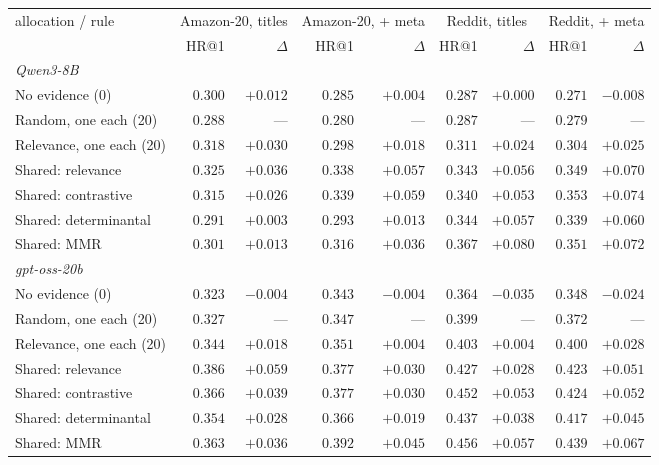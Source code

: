 \begin{tabular}{lrrrrrrrr}
\toprule
allocation / rule & \multicolumn{2}{c}{Amazon-20, titles} & \multicolumn{2}{c}{Amazon-20, + meta} & \multicolumn{2}{c}{Reddit, titles} & \multicolumn{2}{c}{Reddit, + meta} \\
 & HR@1 & $\Delta$ & HR@1 & $\Delta$ & HR@1 & $\Delta$ & HR@1 & $\Delta$ \\
\midrule\multicolumn{9}{l}{\emph{Qwen3-8B}} \\
No evidence (0) & $0.300$ & $+0.012$ & $0.285$ & $+0.004$ & $0.287$ & $+0.000$ & $0.271$ & $-0.008$ \\
Random, one each (20) & $0.288$ & --- & $0.280$ & --- & $0.287$ & --- & $0.279$ & --- \\
Relevance, one each (20) & $0.318$ & $\mathit{+0.030}$ & $0.298$ & $+0.018$ & $0.311$ & $+0.024$ & $0.304$ & $\mathit{+0.025}$ \\
Shared: relevance & $0.325$ & $\mathit{+0.036}$ & $0.338$ & $\mathbf{+0.057}$ & $0.343$ & $\mathbf{+0.056}$ & $0.349$ & $\mathbf{+0.070}$ \\
Shared: contrastive & $0.315$ & $+0.026$ & $0.339$ & $\mathbf{+0.059}$ & $0.340$ & $\mathbf{+0.053}$ & $0.353$ & $\mathbf{+0.074}$ \\
Shared: determinantal & $0.291$ & $+0.003$ & $0.293$ & $+0.013$ & $0.344$ & $\mathbf{+0.057}$ & $0.339$ & $\mathbf{+0.060}$ \\
Shared: MMR & $0.301$ & $+0.013$ & $0.316$ & $\mathbf{+0.036}$ & $0.367$ & $\mathbf{+0.080}$ & $0.351$ & $\mathbf{+0.072}$ \\
\midrule\multicolumn{9}{l}{\emph{gpt-oss-20b}} \\
No evidence (0) & $0.323$ & $-0.004$ & $0.343$ & $-0.004$ & $0.364$ & $\mathbf{-0.035}$ & $0.348$ & $\mathbf{-0.024}$ \\
Random, one each (20) & $0.327$ & --- & $0.347$ & --- & $0.399$ & --- & $0.372$ & --- \\
Relevance, one each (20) & $0.344$ & $+0.018$ & $0.351$ & $+0.004$ & $0.403$ & $+0.004$ & $0.400$ & $\mathbf{+0.028}$ \\
Shared: relevance & $0.386$ & $\mathbf{+0.059}$ & $0.377$ & $\mathit{+0.030}$ & $0.427$ & $\mathit{+0.028}$ & $0.423$ & $\mathbf{+0.051}$ \\
Shared: contrastive & $0.366$ & $\mathbf{+0.039}$ & $0.377$ & $\mathit{+0.030}$ & $0.452$ & $\mathbf{+0.053}$ & $0.424$ & $\mathbf{+0.052}$ \\
Shared: determinantal & $0.354$ & $+0.028$ & $0.366$ & $+0.019$ & $0.437$ & $\mathbf{+0.038}$ & $0.417$ & $\mathbf{+0.045}$ \\
Shared: MMR & $0.363$ & $\mathit{+0.036}$ & $0.392$ & $\mathbf{+0.045}$ & $0.456$ & $\mathbf{+0.057}$ & $0.439$ & $\mathbf{+0.067}$ \\
\bottomrule
\end{tabular}
